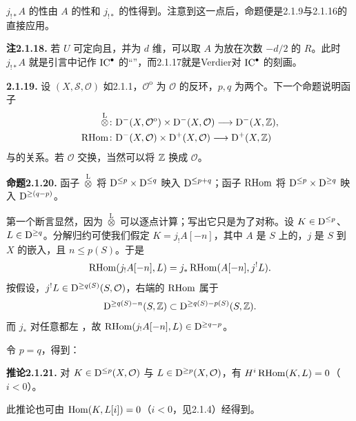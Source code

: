 $j_{!*}A$ 的性由 $A$ 的性和 $j_{!*}$ 的性得到。注意到这一点后，命题便是2.1.9与2.1.16的直接应用。

\par\medskip\noindent\textbf{注2.1.18.} 若 $U$ 可定向且，并为 $d$ 维，可以取 $A$ 为放在次数 $-d/2$ 的 $R$。此时 $j_{!*}A$ 就是引言中记作 $\operatorname{IC}^\bullet$ 的“”，而2.1.17就是Verdier对 $\operatorname{IC}^\bullet$ 的刻画。

\par\medskip\noindent\textbf{2.1.19.} 设 $(X,\mathcal S,\mathcal O)$ 如2.1.1，$\mathcal O^{\mathrm o}$ 为 $\mathcal O$ 的反环，$p,q$ 为两个。下一个命题说明函子
\[
 \begin{aligned}
 \mathbin{\overset{\mathrm L}{\otimes}}\colon&\mathrm{D}^-(X,\mathcal O^{\mathrm o})\times\mathrm{D}^-(X,\mathcal O)\longrightarrow\mathrm{D}^-(X,\mathbb Z),\\
 \operatorname{RHom}\colon&\mathrm{D}^-(X,\mathcal O)\times\mathrm{D}^+(X,\mathcal O)\longrightarrow\mathrm{D}^+(X,\mathbb Z)
 \end{aligned}
\]
与的关系。若 $\mathcal O$ 交换，当然可以将 $\mathbb Z$ 换成 $\mathcal O$。

\par\medskip\noindent\textbf{命题2.1.20.} 函子 $\overset{\mathrm L}{\otimes}$ 将 $\mathrm{D}^{\leq p}\times\mathrm{D}^{\leq q}$ 映入 $\mathrm{D}^{\leq p+q}$；函子 $\operatorname{RHom}$ 将 $\mathrm{D}^{\leq p}\times\mathrm{D}^{\geq q}$ 映入 $\mathrm{D}^{\geq(q-p)}$。

第一个断言显然，因为 $\overset{\mathrm L}{\otimes}$ 可以逐点计算；写出它只是为了对称。设 $K\in\mathrm{D}^{\leq p}$、$L\in\mathrm{D}^{\geq q}$。分解归约可使我们假定 $K=j_!A[-n]$，其中 $A$ 是 $S$ 上的，$j$ 是 $S$ 到 $X$ 的嵌入，且 $n\leq p(S)$。于是
\[
 \operatorname{RHom}(j_!A[-n],L)=j_*\operatorname{RHom}(A[-n],j^!L).
\]
按假设，$j^!L\in\mathrm{D}^{\geq q(S)}(S,\mathcal O)$，右端的 $\operatorname{RHom}$ 属于
\[
 \mathrm{D}^{\geq q(S)-n}(S,\mathbb Z)\subset\mathrm{D}^{\geq q(S)-p(S)}(S,\mathbb Z).
\]
而 $j_*$ 对任意都左 ，故 $\operatorname{RHom}(j_!A[-n],L)\in\mathrm{D}^{\geq q-p}$。

令 $p=q$，得到：

\par\medskip\noindent\textbf{推论2.1.21.} 对 $K\in\mathrm{D}^{\leq p}(X,\mathcal O)$ 与 $L\in\mathrm{D}^{\geq p}(X,\mathcal O)$，有 $H^i\operatorname{RHom}(K,L)=0$（$i<0$）。

此推论也可由 $\operatorname{Hom}(K,L[i])=0$（$i<0$，见2.1.4）经得到。

